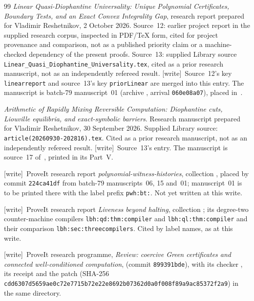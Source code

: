\documentclass[11pt,letterpaper]{article}
\theoremstyle{definition}
\theoremstyle{remark}
\newcommand{\wtag}{\textup{[write]}}
\begin{document}
\begin{thebibliography}{99}
\emph{Linear Quasi-Diophantine Universality: Unique Polynomial Certificates,
Boundary Tests, and an Exact Convex Integrality Gap}, research report
prepared for Vladimir Reshetnikov, 2 October 2026. Source~12: earlier project report
in the supplied research corpus, inspected in PDF/TeX form, cited
for project provenance and comparison, not as a published priority claim
or a machine-checked dependency of the present proofs. Source~13: supplied Library source \texttt{Linear\_Quasi\_Diophantine\_Universality.tex}, cited as a prior research manuscript, not as an independently refereed result.
\wtag\ Source~12's key \texttt{linearreport} and source~13's key \texttt{priorLinear} are merged into this entry. The manuscript is batch-79 manuscript~01 (archive , arrival \texttt{060e08a07}), placed in~\cite{pwh}.

\emph{Arithmetic of Rapidly Mixing Reversible Computation: Diophantine cuts,
Liouville equilibria, and exact-symbolic barriers}.
Research manuscript prepared for Vladimir Reshetnikov, 30 September 2026.
Supplied Library source: \texttt{article(20260930-202816).tex}.
Cited as a prior research manuscript, not as an independently refereed result.
\wtag\ Source~13's entry. The manuscript is source~17 of~\cite{pqc}, printed in its Part~V.

\wtag\ ProveIt research report \emph{polynomial-witness-histories}, collection , placed by commit \texttt{224ca41df} from batch-79 manuscripts~06, 15 and~01; manuscript~01 is to be printed there with the label prefix \texttt{pwh:bt:}. Not yet written at this write.

\wtag\ ProveIt research report \emph{Liveness beyond halting}, collection ; its degree-two counter-machine compilers \texttt{lbh:qd:thm:compiler} and \texttt{lbh:ql:thm:compiler} and their comparison \texttt{lbh:sec:threecompilers}. Cited by label names, as at this write.

\wtag\ ProveIt research programme, \emph{Review: coercive Green certificates and connected well-conditioned computation},  (commit \texttt{899391bde}), with its checker , its receipt  and the patch  (SHA-256 \texttt{cdd6307d5659ae0c72e7715b72e22e8692b07362d0a0f008f89a9ac85372f2a9}) in the same directory.


\end{thebibliography}
\end{document}
